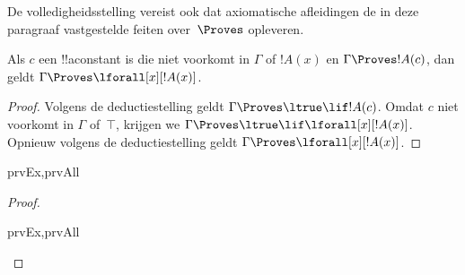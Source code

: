 \documentclass[../../../include/open-logic-section]{subfiles}
\begin{document}


\begin{explain}
  De volledigheidsstelling vereist ook dat axiomatische afleidingen de
  in deze paragraaf vastgestelde feiten over~$\Proves$ opleveren.
\end{explain}

\begin{thm}
 Als $c$ een !!a{constant} is die niet
voorkomt in $\Gamma$ of $!A(x)$ en $\Gamma \Proves !A(c)$, dan geldt
$\Gamma \Proves \lforall[x][!A(x)]$.
\end{thm}

\begin{proof}
Volgens de deductiestelling geldt $\Gamma \Proves \ltrue \lif !A(c)$.
Omdat $c$ niet voorkomt in $\Gamma$ of~$\top$, krijgen we
$\Gamma \Proves \ltrue \lif \lforall[x][!A(x)]$. Opnieuw volgens de
deductiestelling geldt $\Gamma \Proves \lforall[x][!A(x)]$.
\end{proof}

\begin{prop}
\begin{tagenumerate}{prvEx,prvAll}

\end{tagenumerate}
\end{prop}

\begin{proof}
\begin{tagenumerate}{prvEx,prvAll}
\end{tagenumerate}
\end{proof}
\end{document}
